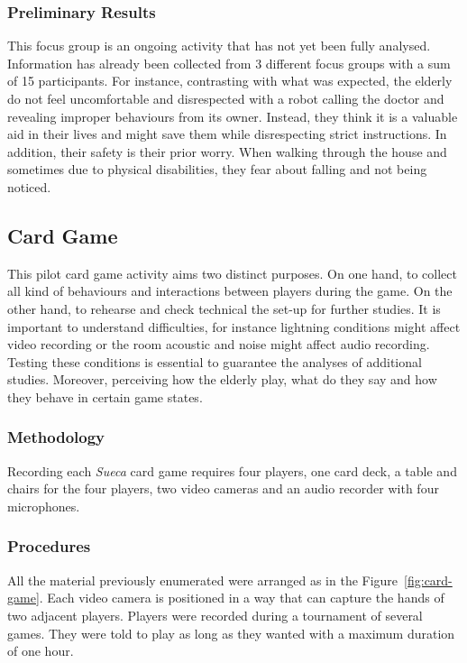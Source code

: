 \subsubsection{Preliminary Results}

This focus group is an ongoing activity that has not yet been fully analysed.
Information has already been collected from 3 different focus groups with a sum of 15 participants.
For instance, contrasting with what was expected, the elderly do not feel uncomfortable and disrespected with a robot calling the doctor and revealing improper behaviours from its owner.
Instead, they think it is a valuable aid in their lives and might save them while disrespecting strict instructions.
In addition, their safety is their prior worry.
When walking through the house and sometimes due to physical disabilities, they fear about falling and not being noticed.







\subsection{Card Game}
This pilot card game activity aims two distinct purposes.
On one hand, to collect all kind of behaviours and interactions between players during the game.
On the other hand, to rehearse and check technical the set-up for further studies.
It is important to understand difficulties, for instance lightning conditions might affect video recording or the room acoustic and noise might affect audio recording.
Testing these conditions is essential to guarantee the analyses of additional studies.
Moreover, perceiving how the elderly play, what do they say and how they behave in certain game states.

\subsubsection{Methodology}
Recording each \emph{Sueca} card game requires four players, one card deck, a table and chairs for the four players, two video cameras and an audio recorder with four microphones.

\subsubsection{Procedures}
All the material previously enumerated were arranged as in the Figure~\ref{fig:card-game}.
Each video camera is positioned in a way that can capture the hands of two adjacent players.
Players were recorded during a tournament of several games.
They were told to play as long as they wanted with a maximum duration of one hour.


